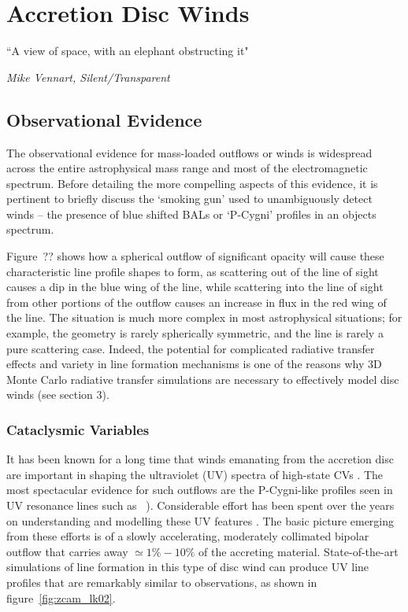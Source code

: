 \chapter{Accretion Disc Winds}
\label{sec:winds}

\epigraph{``A view of space, with an elephant obstructing it"}
{{\sl Mike Vennart, Silent/Transparent}}


\section{Observational Evidence}

The observational evidence for mass-loaded outflows or winds is 
widespread across the entire astrophysical mass range and most of
the electromagnetic spectrum. Before detailing the more compelling aspects
of this evidence, it is pertinent to briefly discuss the `smoking gun'
used to unambiguously detect winds -- the presence of blue shifted BALs
or `P-Cygni' profiles in an objects spectrum. 

Figure~?? shows how a spherical outflow of significant opacity will 
cause these characteristic line profile shapes to form, as scattering out of the line of sight 
causes a dip in the blue wing of the line, while scattering into the 
line of sight from other portions of the outflow causes an increase in flux
in the red wing of the line. The situation is much more complex in most
astrophysical situations; for example, the geometry is rarely spherically 
symmetric, and the line is rarely a pure scattering case. Indeed, the potential 
for complicated radiative transfer effects and variety in line formation mechanisms
is one of the reasons why 3D Monte Carlo radiative transfer simulations are necessary
to effectively model disc winds (see section 3).

\subsection{Cataclysmic Variables}

It has been known for a long time that winds emanating from the
accretion disc are important in shaping the ultraviolet (UV) spectra
of high-state CVs \citep{heap1978, greensteinoke1982}. The most spectacular evidence for such
outflows are the P-Cygni-like profiles seen in UV resonance lines such as
\civfull\ \citep[][; see figure~\ref{fig:cordova}]{cordova1982}). 
Considerable effort has been spent over the
years on understanding and modelling these UV features 
\citep[e.g.][]{drewverbunt1985,maucheraymond1987,SV93,KWD96,
kd1997,knigge1997,LK02,noebauer,puebla2011}. 
The basic picture emerging from these efforts is
of a slowly accelerating, moderately collimated bipolar
outflow that carries away $\simeq 1\% - 10\%$ of the accreting
material. State-of-the-art simulations of line formation in this type
of disc wind can produce UV line profiles that are remarkably similar
to observations, as shown in figure~\ref{fig:zcam_lk02}.

